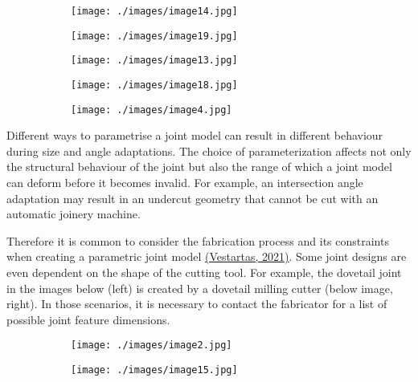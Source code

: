 \begin{figure}[H]
\centering
\begin{subfigure}[b]{0.18\textwidth}
\centering
\texttt{[image: ./images/image14.jpg]}
\end{subfigure}
\hfill
\begin{subfigure}[b]{0.18\textwidth}
\centering
\texttt{[image: ./images/image19.jpg]}
\end{subfigure}
\hfill
\begin{subfigure}[b]{0.18\textwidth}
\centering
\texttt{[image: ./images/image13.jpg]}
\end{subfigure}
\hfill
\begin{subfigure}[b]{0.18\textwidth}
\centering
\texttt{[image: ./images/image18.jpg]}
\end{subfigure}
\hfill
\begin{subfigure}[b]{0.18\textwidth}
\centering
\texttt{[image: ./images/image4.jpg]}
\end{subfigure}
\end{figure}


Different ways to parametrise a joint model can result in different behaviour during size and angle adaptations. The choice of parameterization affects not only the structural behaviour of the joint but also the range of which a joint model can deform before it becomes invalid. For example, an intersection angle adaptation may result in an undercut geometry that cannot be cut with an automatic joinery machine.

Therefore it is common to consider the fabrication process and its constraints when creating a parametric joint model \href{https://www.zotero.org/google-docs/?mr32kk}{(Vestartas, 2021)}. Some joint designs are even dependent on the shape of the cutting tool. For example, the dovetail joint in the images below (left) is created by a dovetail milling cutter (below image, right). In those scenarios, it is necessary to contact the fabricator for a list of possible joint feature dimensions. 

\begin{figure}[H]
\centering
\begin{subfigure}[b]{0.45\textwidth}
\centering
\texttt{[image: ./images/image2.jpg]}
\end{subfigure}
\hfill
\begin{subfigure}[b]{0.45\textwidth}
\centering
\texttt{[image: ./images/image15.jpg]}
\end{subfigure}
\end{figure}



